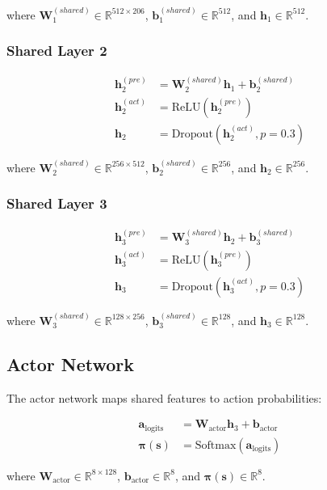 \documentclass[12pt]{article}
\begin{document}
where $\mathbf{W}_1^{(shared)} \in \mathbb{R}^{512 \times 206}$, $\mathbf{b}_1^{(shared)} \in \mathbb{R}^{512}$, and $\mathbf{h}_1 \in \mathbb{R}^{512}$.

\subsubsection{Shared Layer 2}
\begin{align}
\mathbf{h}_2^{(pre)} &= \mathbf{W}_2^{(shared)} \mathbf{h}_1 + \mathbf{b}_2^{(shared)} \\
\mathbf{h}_2^{(act)} &= \text{ReLU}(\mathbf{h}_2^{(pre)}) \\
\mathbf{h}_2 &= \text{Dropout}(\mathbf{h}_2^{(act)}, p=0.3)
\end{align}

where $\mathbf{W}_2^{(shared)} \in \mathbb{R}^{256 \times 512}$, $\mathbf{b}_2^{(shared)} \in \mathbb{R}^{256}$, and $\mathbf{h}_2 \in \mathbb{R}^{256}$.

\subsubsection{Shared Layer 3}
\begin{align}
\mathbf{h}_3^{(pre)} &= \mathbf{W}_3^{(shared)} \mathbf{h}_2 + \mathbf{b}_3^{(shared)} \\
\mathbf{h}_3^{(act)} &= \text{ReLU}(\mathbf{h}_3^{(pre)}) \\
\mathbf{h}_3 &= \text{Dropout}(\mathbf{h}_3^{(act)}, p=0.3)
\end{align}

where $\mathbf{W}_3^{(shared)} \in \mathbb{R}^{128 \times 256}$, $\mathbf{b}_3^{(shared)} \in \mathbb{R}^{128}$, and $\mathbf{h}_3 \in \mathbb{R}^{128}$.

\subsection{Actor Network}

The actor network maps shared features to action probabilities:

\begin{align}
\mathbf{a}_{\text{logits}} &= \mathbf{W}_{\text{actor}} \mathbf{h}_3 + \mathbf{b}_{\text{actor}} \\
\boldsymbol{\pi}(\mathbf{s}) &= \text{Softmax}(\mathbf{a}_{\text{logits}})
\end{align}

where $\mathbf{W}_{\text{actor}} \in \mathbb{R}^{8 \times 128}$, $\mathbf{b}_{\text{actor}} \in \mathbb{R}^{8}$, and $\boldsymbol{\pi}(\mathbf{s}) \in \mathbb{R}^{8}$.
\end{document}
